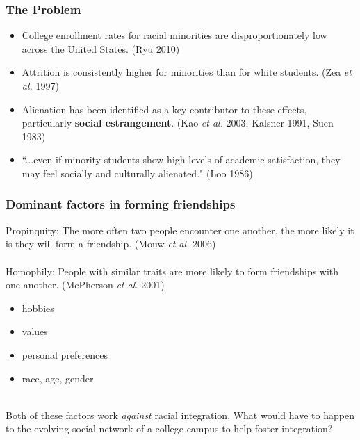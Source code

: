 \documentclass{beamer}
\begin{document}

\begin{frame}
\frametitle{The Problem}
\begin{itemize}
\item College enrollment rates for racial minorities are disproportionately
low across the United States. (Ryu 2010)
\pause
\item Attrition is consistently higher for minorities than for white students.
(Zea \textit{et al.} 1997)
\pause
\item Alienation has been identified as a key contributor to these effects,
particularly \textbf{social estrangement}. (Kao \textit{et al.} 2003, Kalsner
1991, Suen 1983)
\pause
\item ``...even if minority students show high levels of academic
satisfaction, they may feel socially and culturally alienated." (Loo 1986)
\end{itemize}

\end{frame}


\begin{frame}
\frametitle{Dominant factors in forming friendships}
Propinquity: The more often two people encounter one another, the more likely
it is they will form a friendship. (Mouw \textit{et al.} 2006)\\

~~\\

\pause
Homophily: People with similar traits are more likely to form friendships with
one another. (McPherson \textit{et al.} 2001)
\begin{itemize}
\item hobbies
\item values
\item personal preferences
\item race, age, gender
\end{itemize}

~~\\

\pause
Both of these factors work \textit{against} racial integration. What would
have to happen to the evolving social network of a college campus to help
foster integration?
\end{frame}

\end{document}
